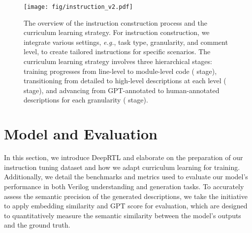 \begin{figure}[ht]
    \centering
    \texttt{[image: fig/instruction\_v2.pdf]}
    \vspace{-12pt}
    \caption{The overview of the instruction construction process and the curriculum learning strategy. For instruction construction, we integrate various settings, \textit{e.g.}, task type, granularity, and comment level, to create tailored instructions for specific scenarios. The curriculum learning strategy involves three hierarchical stages: training progresses from line-level to module-level code ( stage), transitioning from detailed to high-level descriptions at each level ( stage), and advancing from GPT-annotated to human-annotated descriptions for each granularity ( stage).}
    \label{fig:instruction}
\end{figure}


\section{Model and Evaluation}

In this section, we introduce DeepRTL and elaborate on the preparation of our instruction tuning dataset and how we adapt curriculum learning for training.
Additionally, we detail the benchmarks and metrics used to evaluate our model's performance in both Verilog understanding and generation tasks.
To accurately assess the semantic precision of the generated descriptions, 
we take the initiative to apply embedding similarity and GPT score for evaluation,
which are designed to quantitatively measure the semantic similarity between the model's outputs and the ground truth.

